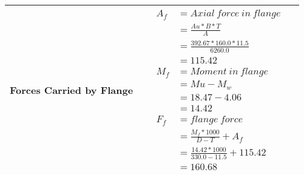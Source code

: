 \documentclass{article}%
\begin{document}
\begin{longtable}{|p{4cm}|p{5cm}|p{5.5cm}|p{1.5cm}|}
\hline%
Forces Carried by Flange&&$\begin{aligned} A_f&= Axial~force~ in ~flange  \\ &= \frac{Au * B *T}{A} \\ &= \frac{392.67 * 160.0*11.5}{6260.0} \\ &=115.42\\ M_f& =Moment~ in~ flange \\  & = Mu-M_w\\ &= 18.47-4.06\\ &=14.42\\  F_f& =flange~force  \\ & = \frac{M_f *1000}{D-T} + A_f \\ &= \frac{14.42*1000}{330.0-11.5} +115.42 \\ &=160.68\end{aligned}$&\\%
\hline%
\end{longtable}

%
\newpage%
\end{document}

